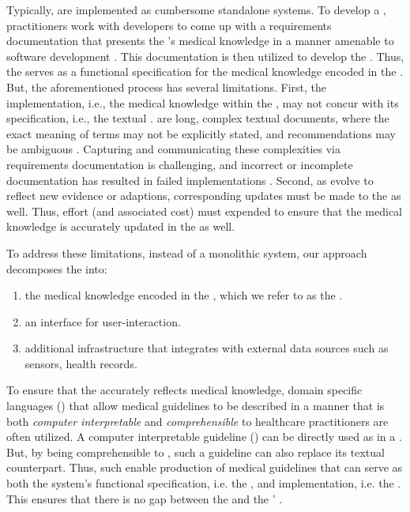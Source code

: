 Typically, \CDSS{} are implemented as cumbersome standalone systems.
To develop a \CDSS{}, practitioners work with
developers to come up with a requirements documentation
that presents the \BPGs{}'s medical knowledge in a manner amenable to software development \cite{PelegJBI13}.
This documentation is then utilized to develop the \CDSS{}.
Thus, the \BPG{}
serves as a functional specification for the medical knowledge encoded in the
\CDSS{}.
But, the aforementioned process has several limitations.
First, the implementation, i.e., the medical knowledge within the \CDSS{},
may not concur with its specification, i.e., the textual \BPG{}.
\BPGs{} are long, complex textual documents,
where the exact meaning of terms may not be explicitly stated, and recommendations may be ambiguous \cite{ClerqAIM03}.
Capturing and communicating these complexities via requirements documentation
is challenging, and incorrect or incomplete documentation has resulted in failed
implementations \cite{KubbenBook19}. Second, as \BPGs{} evolve to reflect
new evidence or adaptions, corresponding updates must be made to the
\CDSS{} as well. Thus, effort (and associated cost) must expended to ensure that the medical knowledge
is accurately updated in the \CDSS{} as well.

To address these limitations, instead of a monolithic system, our approach
decomposes the \CDSSs{} into:
\begin{enumerate}[label=(\alph*)]
  \item the medical knowledge encoded in the \CDSS{}, which we refer to as the
    \BPGLogic{}.
  \item an interface for user-interaction.
  \item additional infrastructure that integrates with external data sources
  such as sensors, health records.
\end{enumerate}

To ensure that the \BPGLogic{} accurately reflects medical knowledge,
domain specific languages (\DSL{}) that allow medical guidelines to
be described in a manner that is both \emph{computer interpretable} and
\emph{comprehensible} to healthcare practitioners are often utilized.
A computer interpretable guideline (\CIG{}) can be directly used as
\BPGLogic{} in a \CDSS{}. But, by being comprehensible to \HCPs{},
such a guideline can also replace its textual counterpart.
Thus, such \DSLs{} enable production of medical guidelines that can serve
as both the system's functional specification, i.e. the \BPG{}, and implementation, i.e. the
\BPGLogic{}. This ensures that there is no gap between the \BPG{} and the
\CDSS{}' \BPGLogic{}.


